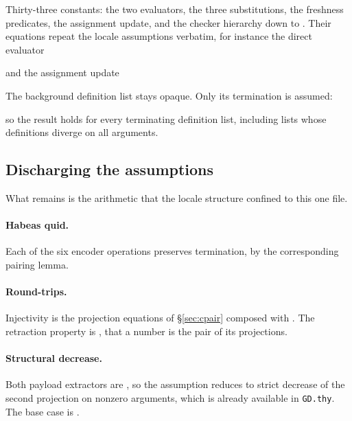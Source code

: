 
\noindent
Thirty-three constants: the two evaluators, the three substitutions, the
freshness predicates, the assignment update, and the checker hierarchy down to
.  Their equations repeat the locale assumptions
verbatim, for instance the direct evaluator


\noindent
and the assignment update


\noindent
The background definition list stays opaque.  Only its termination is assumed:

\begin{center}
\end{center}

\noindent
so the result holds for every terminating definition list, including lists
whose definitions diverge on all arguments.

\subsection{Discharging the assumptions}

What remains is the arithmetic that the locale structure confined to this one
file.

\paragraph{Habeas quid.}
Each of the six encoder operations preserves termination, by the corresponding
pairing lemma.


\paragraph{Round-trips.}
Injectivity is the projection equations of \S\ref{sec:cpair} composed with
.  The retraction property is , that a
number is the pair of its projections.


\paragraph{Structural decrease.}
Both payload extractors are , so the assumption reduces to strict
decrease of the second projection on nonzero arguments, which is already
available in \texttt{GD.thy}.  The base case is
.

